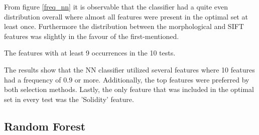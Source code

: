 \documentclass{kththesis}
\begin{document}
\newpage

From figure \ref{freq_nn} it is observable that the classifier had a quite even distribution overall where almost all features were present in the optimal set at least once. Furthermore the distribution between the morphological and SIFT features was slightly in the favour of the first-mentioned.  


\begin{table}[h!]
  \begin{center}
    \caption{The features with at least 9 occurrences in the 10 tests.}
  \end{center}
  \label{nn_features}
\end{table}

The results show that the NN classifier utilized several features where 10 features had a frequency of $0.9$ or more. Additionally, the top features were preferred by both selection methods. Lastly, the only feature that was included in the optimal set in every test was the 'Solidity' feature.

\newpage

\subsection{Random Forest}
\end{document}
